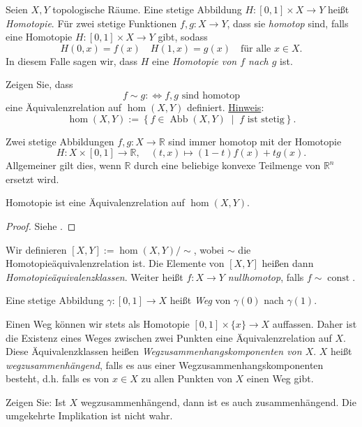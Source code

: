 \documentclass[
12pt, 
openany, 
a4paper, 
final,
fleqn, 
]{myclass}
\numberwithin{equation}{chapter}
\numberwithin{section}{chapter}
\newcommand{\set}[2]{\left\{#1\;\middle|\;#2\right\}}
\DeclareMathOperator{\abb}{Abb}
\newcommand{\todo}[1]{}
\newcommand{\hint}[1]{\newline\noindent\underline{Hinweis}: #1}
\begin{document}
\begin{defn}\label{4.26}
Seien $ X, Y $ topologische Räume. Eine stetige Abbildung $ H:[0,1]\times X \to Y $ heißt \emph{Homotopie}. Für zwei stetige Funktionen $ f, g: X \to Y $, dass sie \emph{homotop} sind, falls eine Homotopie $ H:[0,1]\times X \to Y $ gibt, sodass 
\[
H(0, x) = f(x) \quad H(1, x) = g(x) \quad \text{für alle }x\in X.
\]
In diesem Falle sagen wir, dass $ H $ eine \emph{Homotopie von $f$ nach $g$} ist.
\end{defn}
\begin{ex}\label{homotopistequivalence}
Zeigen Sie, dass 
\[
f\sim g :\iff f, g\text{ sind homotop}
\]
eine Äquivalenzrelation auf $\hom(X, Y)$ definiert. 
\hint{\[ \hom(X, Y) := \set{f\in \abb(X, Y)}{f \text{ ist stetig}}. \]}
\end{ex}

\begin{eg}\label{4.27}
Zwei stetige Abbildungen $ f, g: X\to \mathbb{R} $ sind immer homotop mit der Homotopie
\[ 
H:X\times [0,1]\to \mathbb{R}, \quad (t, x) \mapsto (1-t)f(x) + tg(x).
\]
Allgemeiner gilt dies, wenn $ \mathbb{R} $ durch eine beliebige konvexe Teilmenge von $ \mathbb{R}^{n} $ ersetzt wird.
\end{eg}

\begin{thr}\label{4.28}
Homotopie ist eine Äquivalenzrelation auf $ \hom(X, Y) $. 
\end{thr}
\begin{proof}
Siehe . \todo{Mache den Beweis trotzdem}
\end{proof}

\begin{defn}\label{4.29}
Wir definieren $ [X, Y]:= \hom(X, Y)/\sim $, wobei $ \sim $ die Homotopieäquivalenzrelation ist. Die Elemente von $ [X, Y] $ heißen dann \emph{Homotopieäquivalenzklassen}. Weiter heißt $ f:X\to Y $ \emph{nullhomotop}, falls $ f\sim \operatorname{const} $. 
\end{defn}

\begin{defn}\label{4.30}
Eine stetige Abbildung $ \gamma:[0,1]\to X $ heißt \emph{Weg} von $ \gamma(0) $ nach $ \gamma(1) $. 
\end{defn}
Einen Weg können wir stets als Homotopie $ [0,1]\times \{x\} \to X$ auffassen. Daher ist die Existenz eines Weges zwischen zwei Punkten eine Äquivalenzrelation auf $ X $. Diese Äquivalenzklassen heißen \emph{Wegzusammenhangskomponenten von $ X $}. $ X $ heißt \emph{wegzusammenhängend}, falls es aus einer Wegzusammenhangskomponenten besteht, d.h. falls es von $ x\in X $ zu allen Punkten von $ X $ einen Weg gibt. 
\begin{ex}\label{4.31}
Zeigen Sie: Ist $ X $ wegzusammenhängend, dann ist es auch zusammenhängend. Die umgekehrte Implikation ist nicht wahr.
\end{ex}
\end{document}
